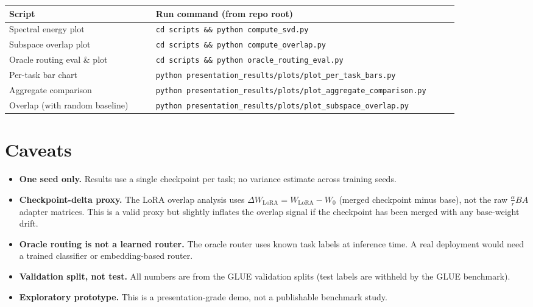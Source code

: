 \documentclass[11pt]{article}
\begin{document}
\begin{longtable}{p{0.3\linewidth}p{0.62\linewidth}}
\toprule
\textbf{Script} & \textbf{Run command (from repo root)} \\
\midrule
Spectral energy plot & \texttt{cd scripts \&\& python compute\_svd.py} \\
Subspace overlap plot & \texttt{cd scripts \&\& python compute\_overlap.py} \\
Oracle routing eval \& plot & \texttt{cd scripts \&\& python oracle\_routing\_eval.py} \\
Per-task bar chart & \texttt{python presentation\_results/plots/plot\_per\_task\_bars.py} \\
Aggregate comparison & \texttt{python presentation\_results/plots/plot\_aggregate\_comparison.py} \\
Overlap (with random baseline) & \texttt{python presentation\_results/plots/plot\_subspace\_overlap.py} \\
\bottomrule
\end{longtable}

\section{Caveats}
\label{sec:caveats}

\begin{itemize}
\item \textbf{One seed only.} Results use a single checkpoint per task; no variance estimate across training seeds.
\item \textbf{Checkpoint-delta proxy.} The LoRA overlap analysis uses $\Delta W_\mathrm{LoRA} = W_\mathrm{LoRA} - W_0$ (merged checkpoint minus base), not the raw $\frac{\alpha}{r}BA$ adapter matrices. This is a valid proxy but slightly inflates the overlap signal if the checkpoint has been merged with any base-weight drift.
\item \textbf{Oracle routing is not a learned router.} The oracle router uses known task labels at inference time. A real deployment would need a trained classifier or embedding-based router.
\item \textbf{Validation split, not test.} All numbers are from the GLUE validation splits (test labels are withheld by the GLUE benchmark).
\item \textbf{Exploratory prototype.} This is a presentation-grade demo, not a publishable benchmark study.
\end{itemize}
\end{document}
